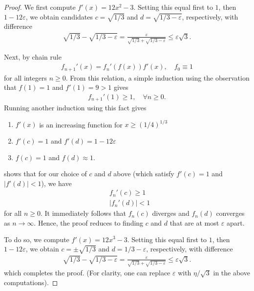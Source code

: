 \documentclass[12pt,reqno]{amsart}
\numberwithin{equation}{section}  %
\newcommand{\ee}{\varepsilon}
\begin{document}
\begin{proof}
We first compute $f'(x) = 12x^2 - 3$. Setting this equal first
to $1$, then $1- 12\ee$, we obtain candidates $c = \sqrt{1/3}$ and $d =
\sqrt{1/3 - \ee}$, respectively, with difference 
\begin{align*}
\sqrt{1/3} - \sqrt{1/3 - \ee} = \frac{\ee}{\sqrt{1/3} + \sqrt{1/3 - \ee}} \le
\ee \sqrt{3}.
\end{align*}

Next, by chain rule
\begin{align*}
f_{n+1}'(x) = f_n'(f(x)) f'(x), \quad f_0 \equiv 1
\end{align*}
for all integers $n \ge 0$.
From this relation, a simple induction 
using the observation that $f(1) = 1$ and $f'(1) = 9 > 1$
gives
\begin{align*}
f_{n+1}'(1) \ge 1, \quad \forall n\ge0.
\end{align*}
Running another induction using this fact gives
\begin{enumerate}
\item
$f'(x)$ is an increasing function for $x \ge (1/4)^{1/3}$ 
\item
$f'(c)=1$ and $f'(d) = 1 - 12 \ee$
\item
$f(c) = 1$ and $f(d) \approx 1$.
\end{enumerate}
shows that for our choice of $c$ and $d$ above
(which satisfy $f'(c) = 1$ and $|f'(d)| < 1$), we have
\begin{align*}
& f_{n}'(c) \ge 1 \\
& | f_{n}'(d) |  < 1
\end{align*}
for all $n \ge 0$. 
It immediately follows that $f_n(c)$ diverges and $f_n(d)$ converges
as $n \to \infty$. Hence, the proof reduces to finding $c$ and $d$ 
that are at most $\ee$ apart.


To do so, we compute $f'(x) = 12x^3 - 3$. Setting this equal first
to $1$, then $1- 12\ee$, we obtain $c = \pm \sqrt{1/3}$ and $d = 1/3 - \ee$,
respectively, with difference 
\begin{align*}
\sqrt{1/3} - \sqrt{1/3 - \ee} = \frac{\ee}{\sqrt{1/3} + \sqrt{1/3 - \ee}} \le
\ee \sqrt{3}.
\end{align*}
which completes the proof. (For clarity, one can replace $\ee$ with
$\eta/\sqrt{3}$ in the above computations).

\end{proof}

        
\end{document}
